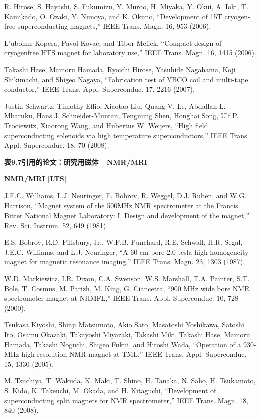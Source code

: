 \noindent [9.366] R. Hirose, S. Hayashi, S. Fukumizu, Y. Muroo, H. Miyaka, Y. Okui, A. Ioki,
T. Kamikado, O. Ozaki, Y. Nunoya, and K. Okuno, ``Development of 15T
cryogen-free superconducting magnets,” IEEE Trans. Magn. 16, 953 (2006).

\noindent [9.367] L’ubomır Kopera, Pavol Kovac, and Tibor Meliek, ``Compact design of cryogenfree
HTS magnet for laboratory use,” IEEE Trans. Magn. 16, 1415 (2006).

\noindent [9.368] Takashi Hase, Mamoru Hamada, Ryoichi Hirose, Yasuhide Nagahama, Koji Shikimachi,
and Shigeo Nagaya, ``Fabrication test of YBCO coil and multi-tape conductor,”
IEEE Trans. Appl. Superconduc. 17, 2216 (2007).

\noindent [9.369] Justin Schwartz, Timothy Effio, Xiaotao Liu, Quang V. Le, Abdallah L. Mbaruku,
Hans J. Schneider-Muntau, Tengming Shen, Honghai Song, Ulf P. Trociewitz,
Xiaorong Wang, and Hubertus W. Weijers, ``High field superconducting solenoids
via high temperature superconductors,” IEEE Trans. Appl. Superconduc. 18, 70
(2008).

\noindent \textbf{表9.7引用的论文：研究用磁体---NMR/MRI}

\noindent \textbf{NMR/MRI [LTS]}

\noindent [9.370] J.E.C. Williams, L.J. Neuringer, E. Bobrov, R. Weggel, D.J. Ruben, and W.G.
Harrison, ``Magnet system of the 500MHz NMR spectrometer at the Francis
Bitter National Magnet Laboratory: I. Design and development of the magnet,”
Rev. Sci. Instrum. 52, 649 (1981).

\noindent [9.371] E.S. Bobrov, R.D. Pillsbury, Jr., W.F.B. Punchard, R.E. Schwall, H.R. Segal,
J.E.C. Williams, and L.J. Neuringer, ``A 60 cm bore 2.0 tesla high homogeneity
magnet for magnetic resonance imaging,” IEEE Trans. Magn. 23, 1303 (1987).

\noindent [9.372] W.D. Markiewicz, I.R. Dixon, C.A. Swenson, W.S. Marshall, T.A. Painter, S.T.
Bole, T. Cosmus, M. Parizh, M. King, G. Ciancetta, ``900 MHz wide bore
NMR spectrometer magnet at NHMFL,” IEEE Trans. Appl. Superconduc. 10, 728
(2000).

\noindent [9.373] Tsukasa Kiyoshi, Shinji Matsumoto, Akio Sato, Masatoshi Yoshikawa, Satoshi
Ito, Osamu Okazaki, Takayoshi Miyazaki, Takashi Miki, Takashi Hase, Mamoru
Hamada, Takashi Noguchi, Shigeo Fukui, and Hitoshi Wada, ``Operation of a 930-
MHz high resolution NMR magnet at TML,” IEEE Trans. Appl. Superconduc.
15, 1330 (2005).

\noindent [9.374] M. Tsuchiya, T. Wakuda, K. Maki, T. Shino, H. Tanaka, N. Saho, H. Tsukamoto,
S. Kido, K. Takeuchi, M. Okada, and H. Kitaguchi, ``Development of superconducting
split magnets for NMR spectrometer,” IEEE Trans. Magn. 18, 840 (2008).

